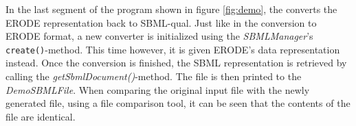 In the last segment of the program shown in figure \ref{fig:demo}, the converts the ERODE representation back to SBML-qual. Just like in the conversion to ERODE format, a new converter is initialized using the \emph{SBMLManager}'s \\
\texttt{create()}-method. This time however, it is given ERODE's data representation instead. Once the conversion is finished, the SBML representation is retrieved by calling the \emph{getSbmlDocument()}-method. The file is then printed to the \emph{DemoSBMLFile}.
When comparing the original input file with the newly generated file, using a file comparison tool, it can be seen that the contents of the file are identical. 
